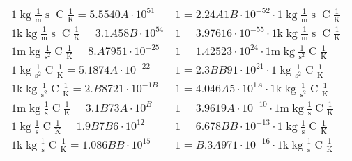 \begin{center}
\begin{longtable}{l l}
{\color{black}$1 \bm{\mathrm{ }}\operatorname{kg}\frac1{\operatorname{m}}{\operatorname{s}}{\operatorname{C}}\frac1{\operatorname{K}} = 5.5540A\cdot10^{51} $}   & {\color{black}$ 1 = 2.24A1B\cdot10^{-52} \cdot 1 \bm{\mathrm{ }}\operatorname{kg}\frac1{\operatorname{m}}{\operatorname{s}}{\operatorname{C}}\frac1{\operatorname{K}}$}  \\
{\color{gray}$1 \bm{\mathrm{ k}}\operatorname{kg}\frac1{\operatorname{m}}{\operatorname{s}}{\operatorname{C}}\frac1{\operatorname{K}} = 3.1A58B\cdot10^{54} $}   & {\color{gray}$ 1 = 3.97616\cdot10^{-55} \cdot 1 \bm{\mathrm{ k}}\operatorname{kg}\frac1{\operatorname{m}}{\operatorname{s}}{\operatorname{C}}\frac1{\operatorname{K}}$}  \\
{\color{gray}$1 \bm{\mathrm{ m}}\operatorname{kg}{}\frac1{\operatorname{s}^2}{\operatorname{C}}\frac1{\operatorname{K}} = 8.A7951\cdot10^{-25} $}   & {\color{gray}$ 1 = 1.42523\cdot10^{24} \cdot 1 \bm{\mathrm{ m}}\operatorname{kg}{}\frac1{\operatorname{s}^2}{\operatorname{C}}\frac1{\operatorname{K}}$}  \\
{\color{black}$1 \bm{\mathrm{ }}\operatorname{kg}{}\frac1{\operatorname{s}^2}{\operatorname{C}}\frac1{\operatorname{K}} = 5.1874A\cdot10^{-22} $}   & {\color{black}$ 1 = 2.3BB91\cdot10^{21} \cdot 1 \bm{\mathrm{ }}\operatorname{kg}{}\frac1{\operatorname{s}^2}{\operatorname{C}}\frac1{\operatorname{K}}$}  \\
{\color{gray}$1 \bm{\mathrm{ k}}\operatorname{kg}{}\frac1{\operatorname{s}^2}{\operatorname{C}}\frac1{\operatorname{K}} = 2.B8721\cdot10^{-1B} $}   & {\color{gray}$ 1 = 4.046A5\cdot10^{1A} \cdot 1 \bm{\mathrm{ k}}\operatorname{kg}{}\frac1{\operatorname{s}^2}{\operatorname{C}}\frac1{\operatorname{K}}$}  \\
{\color{gray}$1 \bm{\mathrm{ m}}\operatorname{kg}{}\frac1{\operatorname{s}}{\operatorname{C}}\frac1{\operatorname{K}} = 3.1B73A\cdot10^{B} $}   & {\color{gray}$ 1 = 3.9619A\cdot10^{-10} \cdot 1 \bm{\mathrm{ m}}\operatorname{kg}{}\frac1{\operatorname{s}}{\operatorname{C}}\frac1{\operatorname{K}}$}  \\
{\color{black}$1 \bm{\mathrm{ }}\operatorname{kg}{}\frac1{\operatorname{s}}{\operatorname{C}}\frac1{\operatorname{K}} = 1.9B7B6\cdot10^{12} $}   & {\color{black}$ 1 = 6.678BB\cdot10^{-13} \cdot 1 \bm{\mathrm{ }}\operatorname{kg}{}\frac1{\operatorname{s}}{\operatorname{C}}\frac1{\operatorname{K}}$}  \\
{\color{gray}$1 \bm{\mathrm{ k}}\operatorname{kg}{}\frac1{\operatorname{s}}{\operatorname{C}}\frac1{\operatorname{K}} = 1.086BB\cdot10^{15} $}   & {\color{gray}$ 1 = B.3A971\cdot10^{-16} \cdot 1 \bm{\mathrm{ k}}\operatorname{kg}{}\frac1{\operatorname{s}}{\operatorname{C}}\frac1{\operatorname{K}}$}  \\

\end{longtable}
\end{center}
